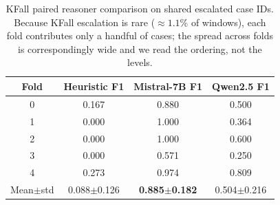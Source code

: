 \begin{table}[!t]
\centering
\caption{KFall paired reasoner comparison on shared escalated case IDs. Because KFall escalation is rare ($\approx1.1\%$ of windows), each fold contributes only a handful of cases; the spread across folds is correspondingly wide and we read the ordering, not the levels.}
\label{tab:kfallllm}
\begin{tabular}{cccc}
\toprule
Fold & Heuristic F1 & Mistral-7B F1 & Qwen2.5 F1 \\
\midrule
0 & 0.167 & 0.880 & 0.500 \\
1 & 0.000 & 1.000 & 0.364 \\
2 & 0.000 & 1.000 & 0.600 \\
3 & 0.000 & 0.571 & 0.250 \\
4 & 0.273 & 0.974 & 0.809 \\
\midrule
Mean$\pm$std & 0.088$\pm$0.126 & \textbf{0.885$\pm$0.182} & 0.504$\pm$0.216 \\
\bottomrule
\end{tabular}
\end{table}
